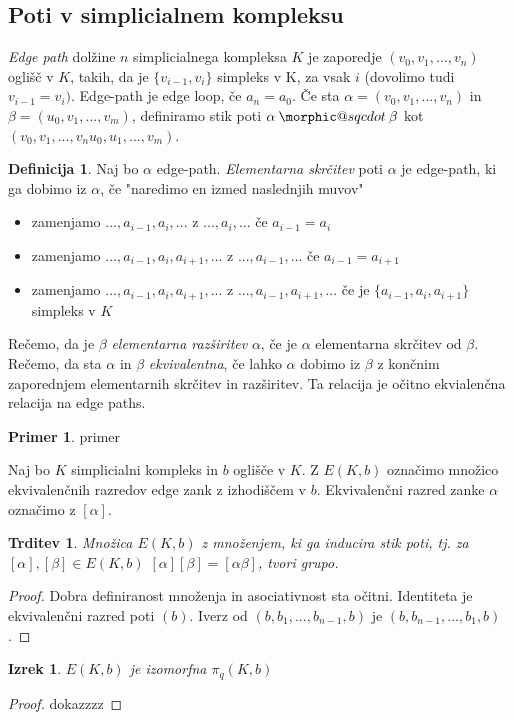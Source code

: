 \documentclass[a4paper,12pt]{article}
\makeatletter
\DeclareRobustCommand{\sqcdot}{\mathbin{\mathpalette\morphic@sqcdot\relax}}
\newcommand{\morphic@sqcdot}[2]{%
\sbox\z@{$\m@th#1\centerdot$}%
\ht\z@=.33333\ht\z@
\vcenter{\box\z@}%
}
\theoremstyle{definition}
\newtheorem{definicija}{Definicija}
\theoremstyle{plain}
\newtheorem{izrek}{Izrek}
\theoremstyle{definition}
\newtheorem{primer}{Primer}
\theoremstyle{plain}
\newtheorem{trditev}{Trditev}
\theoremstyle{plain}
\theoremstyle{plain}
\theoremstyle{plain}
\makeatother
\begin{document}
\subsection{Poti v simplicialnem kompleksu}

\textit{Edge path} dolžine $n$ simplicialnega kompleksa $K$ je zaporedje
$(v_0,v_1,...,v_{n})$ oglišč v $K$, takih, da je $\{v_{i-1},v_i\}$ simpleks v K, za vsak $i$ (dovolimo tudi $v_{i-1}=v_i)$. Edge-path je edge loop, če $a_n=a_0$. Če sta $\alpha =(v_0,v_1,...,v_{n})$ in $\beta=(u_0,v_1,...,v_{m})$, definiramo stik poti $\alpha\sqcdot \beta$ kot $(v_0,v_1,...,v_{n}u_0,u_1,...,v_{m})$. 

\begin{definicija}
    Naj bo $\alpha$ edge-path. \textit{Elementarna skrčitev} poti $\alpha$ je edge-path, ki ga dobimo iz $\alpha$, če "naredimo en izmed naslednjih muvov"

    \begin{itemize}
        \item zamenjamo $...,a_{i-1},a_i,...$ z $...,a_i,...$ če $a_{i-1}=a_i$
        \item zamenjamo $...,a_{i-1},a_i,a_{i+1},...$ z $...,a_{i-1},...$ če $a_{i-1}=a_{i+1}$
        \item zamenjamo $...,a_{i-1},a_i,a_{i+1},...$ z $...,a_{i-1},a_{i+1},...$ če je $\{a_{i-1},a_i,a_{i+1}\}$ simpleks v $K$
    \end{itemize}

    Rečemo, da je $\beta$ \textit{elementarna razširitev} $\alpha$, če je $\alpha$ elementarna skrčitev od $\beta$. Rečemo, da sta $\alpha$ in $\beta$ \textit{ekvivalentna}, če lahko $\alpha$ dobimo iz $\beta$ z končnim zaporednjem elementarnih skrčitev in razširitev. Ta relacija je očitno ekvialenčna relacija na edge paths.
\end{definicija}

\begin{primer}
    primer
\end{primer}

    Naj bo $K$ simplicialni kompleks in $b$ oglišče v $K$. Z $E(K,b)$ označimo množico ekvivalenčnih razredov edge zank z izhodiščem v $b$. Ekvivalenčni razred zanke $\alpha$ označimo z $[\alpha]$.

    \begin{trditev}
        Množica $E(K,b)$ z množenjem, ki ga inducira stik poti, tj. za $[\alpha],[\beta] \in E(K,b)$  $[\alpha][\beta]=[\alpha \beta]$, tvori grupo.
    \end{trditev}
\begin{proof}
    Dobra definiranost množenja in asociativnost sta očitni. Identiteta je ekvivalenčni razred poti $(b)$. Iverz od $(b,b_1,...,b_{n-1},b)$ je $(b,b_{n-1},...,b_1,b)$.
\end{proof}

\begin{izrek}
    \label{iz:grupa lomljenk}
$E(K,b)$ je izomorfna $\pi_q(K,b)$
\end{izrek}

\begin{proof}
    dokazzzz
\end{proof}
\end{document}

